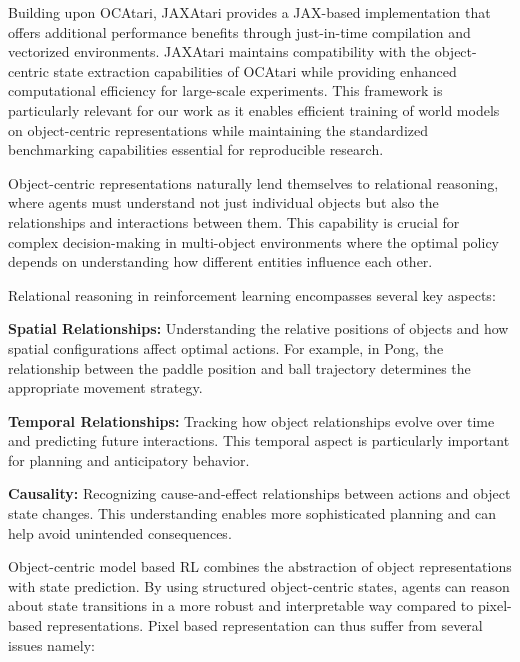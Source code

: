 \documentclass[
	english,
	ruledheaders=section,
	class=report,
	thesis={type=master},
	accentcolor=9c,
	custommargins=true,
	marginpar=false,
	parskip=half-,
	fontsize=11pt,
]{tudapub}
\begin{document}
Building upon OCAtari, JAXAtari \cite{machado2023revisiting} provides a
JAX-based implementation that offers additional performance benefits through
just-in-time compilation and vectorized environments. JAXAtari maintains
compatibility with the object-centric state extraction capabilities of OCAtari
while providing enhanced computational efficiency for large-scale experiments.
This framework is particularly relevant for our work as it enables efficient
training of world models on object-centric representations while maintaining
the standardized benchmarking capabilities essential for reproducible research.

Object-centric representations naturally lend themselves to relational
reasoning, where agents must understand not just individual objects but also
the relationships and interactions between them. This capability is crucial for
complex decision-making in multi-object environments where the optimal policy
depends on understanding how different entities influence each other.

Relational reasoning in reinforcement learning encompasses several key aspects:

\textbf{Spatial Relationships:} Understanding the relative positions of objects and how spatial configurations affect optimal actions. For example, in Pong, the relationship between the paddle position
and ball trajectory determines the appropriate movement strategy.

\textbf{Temporal Relationships:} Tracking how object relationships evolve over time and predicting future interactions. This temporal aspect is particularly important for planning and anticipatory behavior.

\textbf{Causality:} \cite{scholkopf2021toward,dasgupta2019causal} Recognizing cause-and-effect relationships between actions and object state changes. This understanding enables more sophisticated planning and can help avoid unintended consequences.



Object-centric model based RL combines the abstraction of object representations
with state prediction. By using structured object-centric states, agents can
reason about state transitions in a more robust and interpretable way compared
to pixel-based representations. Pixel based representation can thus suffer from
several issues namely:
\end{document}
